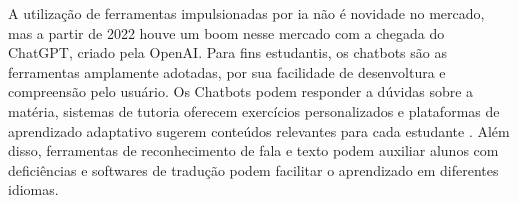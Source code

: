 A utilização de ferramentas impulsionadas por \ac{ia} não é novidade no mercado, mas a partir de 2022 houve um boom nesse mercado com a chegada do  ChatGPT, criado pela OpenAI. Para fins estudantis, os chatbots são as ferramentas amplamente adotadas, por sua facilidade de desenvoltura e compreensão pelo usuário.
Os Chatbots podem responder a dúvidas sobre a matéria, sistemas de tutoria oferecem exercícios personalizados e plataformas de aprendizado adaptativo sugerem conteúdos relevantes para cada estudante \cite{silva2023inteligencia}. Além disso, ferramentas de reconhecimento de fala e texto podem auxiliar alunos com deficiências e softwares de tradução podem facilitar o aprendizado em diferentes idiomas.




